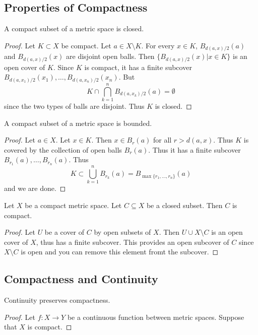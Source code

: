 \subsection{Properties of Compactness}
\begin{prp}{}{} A compact subset of a metric space is closed. \tcbline
\begin{proof}
Let $K\subset X$ be compact. Let $a\in X\setminus K$. For every $x\in K$, $B_{d(a,x)/2}(a)$ and $B_{d(a,x)/2}(x)$ are disjoint open balls. Then $\{B_{d(a,x)/2}(x)|x\in K\}$ is an open cover of $K$. Since $K$ is compact, it has a finite subcover $B_{d(a,x_1)/2}(x_1),\dots,B_{d(a,x_n)/2}(x_n)$. But $$K\cap\bigcap_{k=1}^nB_{d(a,x_k)/2}(a)=\emptyset$$ since the two types of balls are disjoint. Thus $K$ is closed. 
\end{proof}
\end{prp}

\begin{prp}{}{} A compact subset of a metric space is bounded. \tcbline
\begin{proof}
Let $a\in X$. Let $x\in K$. Then $x\in B_r(a)$ for all $r>d(a,x)$. Thus $K$ is covered by the collection of open balls $B_r(a)$. Thus it has a finite subcover $B_{r_1}(a),\dots,B_{r_n}(a)$. Thus $$K\subset\bigcup_{k=1}^nB_{r_k}(a)=B_{\max\{r_1,\dots,r_n\}}(a)$$ and we are done. 
\end{proof}
\end{prp}

\begin{prp}{}{} Let $X$ be a compact metric space. Let $C\subseteq X$ be a closed subset. Then $C$ is compact. \tcbline
\begin{proof}
Let $U$ be a cover of $C$ by open subsets of $X$. Then $U\cup X\setminus C$ is an open cover of $X$, thus has a finite subcover. This provides an open subcover of $C$ since $X\setminus C$ is open and you can remove this element fromt the subcover. 
\end{proof}
\end{prp}

\subsection{Compactness and Continuity}
\begin{thm}{}{} Continuity preserves compactness. \tcbline
\begin{proof}
Let $f:X\to Y$ be a continuous function between metric spaces. Suppose that $X$ is compact. 
\end{proof}
\end{thm}

